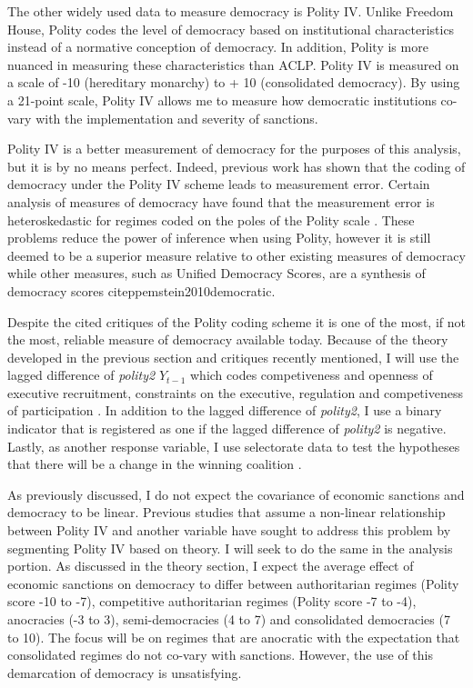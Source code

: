 \documentclass[a4paper]{article}\usepackage[]{graphicx}\usepackage[]{color}
\begin{document}
\par
The other widely used data to measure democracy is Polity IV. Unlike Freedom House, Polity codes the level of democracy based on institutional characteristics instead of a normative conception of democracy. In addition, Polity is more nuanced in measuring these characteristics than ACLP. Polity IV is measured on a scale of -10 (hereditary monarchy) to + 10 (consolidated democracy). By using a 21-point scale, Polity IV allows me to measure how democratic institutions co-vary with the implementation and severity of sanctions.  
\par
Polity IV is a better measurement of democracy for the purposes of this analysis, but it is by no means perfect. Indeed, previous work has shown that the coding of democracy under the Polity IV scheme leads to measurement error. Certain analysis of measures of democracy have found that the measurement error is heteroskedastic for regimes coded on the poles of the Polity scale \citep{treier2008democracy, pemstein2010democratic}. These problems reduce the power of inference when using Polity, however it is still deemed to be a superior measure relative to other existing measures of democracy \citep{munck2002conceptualizing} while other measures, such as Unified Democracy Scores, are a synthesis of democracy scores citep{pemstein2010democratic}.
\par
Despite the cited critiques of the Polity coding scheme it is one of the most, if not the most, reliable measure of democracy available today. Because of the theory developed in the previous section and critiques recently mentioned, I will use the lagged difference of \textit{polity2} $Y_{t-1}$ which codes competiveness and openness of executive recruitment, constraints on the executive, regulation and competiveness of participation \citep{marshall2002polity}. In addition to the lagged difference of \textit{polity2}, I use a binary indicator that is registered as one if the lagged difference of  \textit{polity2} is negative. Lastly, as another response variable, I use selectorate data to test the hypotheses that there will be a change in the winning coalition \citep{smith2005logic}. 
\par
As previously discussed, I do not expect the covariance of economic sanctions and democracy to be linear. Previous studies that assume a non-linear relationship between Polity IV and another variable have sought to address this problem by segmenting Polity IV based on theory. I will seek to do the same in the analysis portion. As discussed in the theory section, I expect the average effect of economic sanctions on democracy to differ between authoritarian regimes (Polity score -10 to -7), competitive authoritarian regimes (Polity score -7 to -4), anocracies (-3 to 3), semi-democracies (4 to 7) and consolidated democracies (7 to 10). The focus will be on regimes that are anocratic \citep{vreeland2008effect, hegre2001toward, fearon2003ethnicity} with the expectation that consolidated regimes do not co-vary with sanctions. However, the use of this demarcation of democracy is unsatisfying.  
\end{document}
